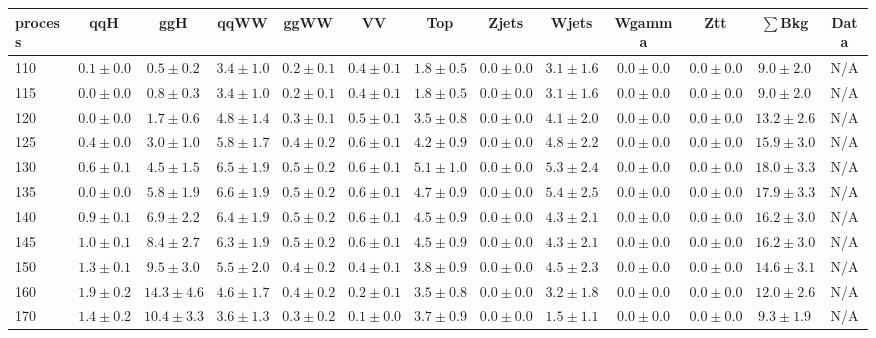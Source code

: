 \begin{table}
{%
 \tiny
 \begin{center}
 \begin{tabular}{l | c c | c c c c c c c c  | c c}
 \hline
 process & qqH & ggH & qqWW & ggWW & VV & Top & Zjets & Wjets & Wgamma & Ztt & $\sum$Bkg & Data \\
 \hline
110 & $0.1\pm0.0$ & $0.5\pm0.2$ & $3.4\pm1.0$ & $0.2\pm0.1$ & $0.4\pm0.1$ & $1.8\pm0.5$ & $0.0\pm0.0$ & $3.1\pm1.6$ & $0.0\pm0.0$ & $0.0\pm0.0$ & $9.0\pm2.0$ & N/A \\
115 & $0.0\pm0.0$ & $0.8\pm0.3$ & $3.4\pm1.0$ & $0.2\pm0.1$ & $0.4\pm0.1$ & $1.8\pm0.5$ & $0.0\pm0.0$ & $3.1\pm1.6$ & $0.0\pm0.0$ & $0.0\pm0.0$ & $9.0\pm2.0$ & N/A \\
120 & $0.0\pm0.0$ & $1.7\pm0.6$ & $4.8\pm1.4$ & $0.3\pm0.1$ & $0.5\pm0.1$ & $3.5\pm0.8$ & $0.0\pm0.0$ & $4.1\pm2.0$ & $0.0\pm0.0$ & $0.0\pm0.0$ & $13.2\pm2.6$ & N/A \\
125 & $0.4\pm0.0$ & $3.0\pm1.0$ & $5.8\pm1.7$ & $0.4\pm0.2$ & $0.6\pm0.1$ & $4.2\pm0.9$ & $0.0\pm0.0$ & $4.8\pm2.2$ & $0.0\pm0.0$ & $0.0\pm0.0$ & $15.9\pm3.0$ & N/A \\
130 & $0.6\pm0.1$ & $4.5\pm1.5$ & $6.5\pm1.9$ & $0.5\pm0.2$ & $0.6\pm0.1$ & $5.1\pm1.0$ & $0.0\pm0.0$ & $5.3\pm2.4$ & $0.0\pm0.0$ & $0.0\pm0.0$ & $18.0\pm3.3$ & N/A \\
135 & $0.0\pm0.0$ & $5.8\pm1.9$ & $6.6\pm1.9$ & $0.5\pm0.2$ & $0.6\pm0.1$ & $4.7\pm0.9$ & $0.0\pm0.0$ & $5.4\pm2.5$ & $0.0\pm0.0$ & $0.0\pm0.0$ & $17.9\pm3.3$ & N/A \\
140 & $0.9\pm0.1$ & $6.9\pm2.2$ & $6.4\pm1.9$ & $0.5\pm0.2$ & $0.6\pm0.1$ & $4.5\pm0.9$ & $0.0\pm0.0$ & $4.3\pm2.1$ & $0.0\pm0.0$ & $0.0\pm0.0$ & $16.2\pm3.0$ & N/A \\
145 & $1.0\pm0.1$ & $8.4\pm2.7$ & $6.3\pm1.9$ & $0.5\pm0.2$ & $0.6\pm0.1$ & $4.5\pm0.9$ & $0.0\pm0.0$ & $4.3\pm2.1$ & $0.0\pm0.0$ & $0.0\pm0.0$ & $16.2\pm3.0$ & N/A \\
150 & $1.3\pm0.1$ & $9.5\pm3.0$ & $5.5\pm2.0$ & $0.4\pm0.2$ & $0.4\pm0.1$ & $3.8\pm0.9$ & $0.0\pm0.0$ & $4.5\pm2.3$ & $0.0\pm0.0$ & $0.0\pm0.0$ & $14.6\pm3.1$ & N/A \\
160 & $1.9\pm0.2$ & $14.3\pm4.6$ & $4.6\pm1.7$ & $0.4\pm0.2$ & $0.2\pm0.1$ & $3.5\pm0.8$ & $0.0\pm0.0$ & $3.2\pm1.8$ & $0.0\pm0.0$ & $0.0\pm0.0$ & $12.0\pm2.6$ & N/A \\
170 & $1.4\pm0.2$ & $10.4\pm3.3$ & $3.6\pm1.3$ & $0.3\pm0.2$ & $0.1\pm0.0$ & $3.7\pm0.9$ & $0.0\pm0.0$ & $1.5\pm1.1$ & $0.0\pm0.0$ & $0.0\pm0.0$ & $9.3\pm1.9$ & N/A \\

\end{tabular}
\end{center}}
\end{table}
